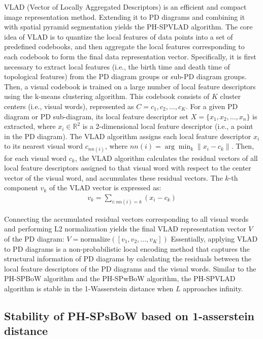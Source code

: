 \documentclass[5GeSdc,ASOC,numref,printGA,printHL,CASflow,nocrossmark,longtitle,PROOF]{/usr/local/texlive/iTemplates/01-Templates/01-Els-Jnl/01-Standard_Templates/V1/ELS_MDL5-V1-6}
\begin{document}
\begin{articlestyle}
VLAD (Vector of Locally Aggregated Descriptors) is an efficient and compact image representation method. Extending it to PD diagrams and combining it with spatial pyramid segmentation yields the PH-SPVLAD algorithm. The core idea of VLAD is to quantize the local features of data points into a set of predefined codebooks, and then aggregate the local features corresponding to each codebook to form the final data representation vector. Specifically, it is first necessary to extract local features (i.e., the birth time and death time of topological features) from the PD diagram groups or sub-PD diagram groups. Then, a visual codebook is trained on a large number of local feature descriptors using the k-means clustering algorithm. This codebook consists of $ K $ cluster centers (i.e., visual words), represented as $ C = c_1, c_2, \ldots, c_K $. For a given PD diagram or PD sub-diagram, its local feature descriptor set $ X = \{x_1, x_2, \ldots, x_n\} $ is extracted, where $ x_i \in \mathbb{R}^2 $ is a 2-dimensional local feature descriptor (i.e., a point in the PD diagram). The VLAD algorithm assigns each local feature descriptor $ x_i $ to its nearest visual word $ c_{nn(i)} $, where $ nn(i) = \arg\min_k \|x_i - c_k\| $. Then, for each visual word $ c_k $, the VLAD algorithm calculates the residual vectors of all local feature descriptors assigned to that visual word with respect to the center vector of the visual word, and accumulates these residual vectors. The $ k $-th component $ v_k $ of the VLAD vector is expressed as:  
\begin{align*}  
v_k = \sum_{i:nn(i)=k} (x_i - c_k)  
\end{align*}  

Connecting the accumulated residual vectors corresponding to all visual words and performing L2 normalization yields the final VLAD representation vector $ V $ of the PD diagram: $ V = \text{normalize}([v_1, v_2, \ldots, v_K]) $ Essentially, applying VLAD to PD diagrams is a non-probabilistic local encoding method that captures the structural information of PD diagrams by calculating the residuals between the local feature descriptors of the PD diagrams and the visual words. Similar to the PH-SPBoW algorithm and the PH-SPwBoW algorithm, the PH-SPVLAD algorithm is stable in the 1-Wasserstein distance when $ L $ approaches infinity.

\subsection{Stability of PH-SPsBoW based on 1-asserstein distance}\label{sec4.3}


\end{articlestyle}
\end{document}
